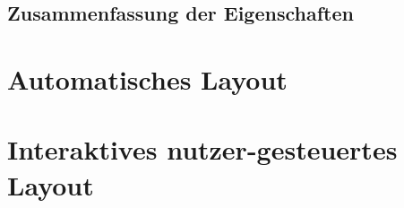 

\subsection{Zusammenfassung der Eigenschaften}


\section{Automatisches Layout}
\label{sec:automatic-layout}


\section{Interaktives nutzer-gesteuertes Layout}
\label{sec:interactive-user-controlled-layout}

